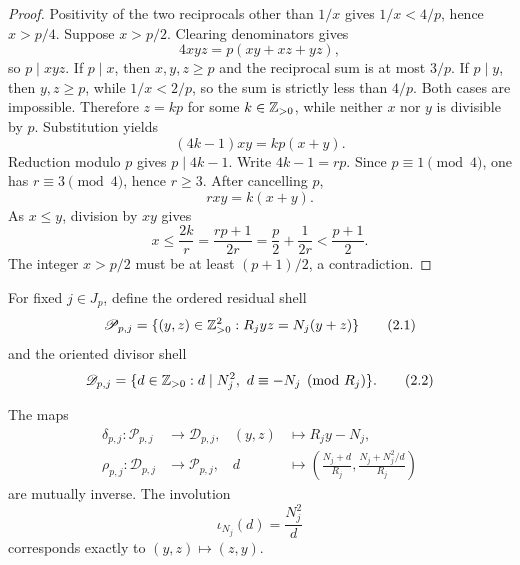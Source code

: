 \begin{proof}
Positivity of the two reciprocals other than \(1/x\) gives
\(1/x<4/p\), hence \(x>p/4\).  Suppose \(x>p/2\).  Clearing denominators
gives
\[
 4xyz=p(xy+xz+yz),
\]
so \(p\mid xyz\).  If \(p\mid x\), then \(x,y,z\geq p\) and the reciprocal
sum is at most \(3/p\).  If \(p\mid y\), then \(y,z\geq p\), while
\(1/x<2/p\), so the sum is strictly less than \(4/p\).  Both cases are
impossible.  Therefore \(z=kp\) for some \(k\in\mathbb Z_{>0}\), while neither
\(x\) nor \(y\) is divisible by \(p\).  Substitution yields
\[
 (4k-1)xy=kp(x+y).
\]
Reduction modulo \(p\) gives \(p\mid4k-1\).  Write \(4k-1=rp\).
Since \(p\equiv1\pmod4\), one has \(r\equiv3\pmod4\), hence \(r\geq3\).
After cancelling \(p\),
\[
 rxy=k(x+y).
\]
As \(x\leq y\), division by \(xy\) gives
\[
 x\leq\frac{2k}{r}
 =\frac{rp+1}{2r}
 =\frac p2+\frac1{2r}<\frac{p+1}{2}.
\]
The integer \(x>p/2\) must be at least \((p+1)/2\), a contradiction.
\end{proof}

For fixed \(j\in J_p\), define the ordered residual shell
\begin{equation}
 \mathscr P_{p,j}=
 \{(y,z)\in\mathbb Z_{>0}^2:R_jyz=N_j(y+z)\}                         \tag{2.1}
\end{equation}
and the oriented divisor shell
\begin{equation}
 \mathscr D_{p,j}=
 \{d\in\mathbb Z_{>0}:d\mid N_j^2,\ d\equiv-N_j\pmod {R_j}\}.       \tag{2.2}
\end{equation}

\begin{proposition}\label{prop:esksb-shell-bijection}
The maps
\begin{align*}
 \delta_{p,j}:\mathscr P_{p,j}&\longrightarrow\mathscr D_{p,j},
 &(y,z)&\longmapsto R_jy-N_j,\\
 \rho_{p,j}:\mathscr D_{p,j}&\longrightarrow\mathscr P_{p,j},
 &d&\longmapsto
 \left(\frac{N_j+d}{R_j},
       \frac{N_j+N_j^2/d}{R_j}\right)
\end{align*}
are mutually inverse.  The involution
\[
 \iota_{N_j}(d)=\frac{N_j^2}{d}
\]
corresponds exactly to \((y,z)\mapsto(z,y)\).
\end{proposition}

